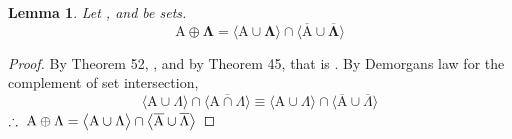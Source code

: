 \documentclass[preview]{standalone}
\newtheorem{lemma}{Lemma}
\begin{document}
\begin{lemma}%
    Let , and \bm{$\Lambda$} be sets.
    \begin{equation*}
        \bm{
            \mathrm{A} \oplus \Lambda
                =
            \Big \langle \mathrm{A} \cup \Lambda \Big \rangle
                \cap
            \Big \langle 
                \overline{\mathrm{A}} 
                    \cup 
                \overline{\Lambda} 
            \Big \rangle
        }
    \end{equation*}
\end{lemma}
\begin{proof}
    By Theorem 52,
    , 
    and by Theorem 45, that is
    .
    By Demorgans law for the complement of set intersection,
    \begin{equation*}
        \Big \langle \mathrm{A} \cup \Lambda \Big \rangle
            \cap
        \Big \langle \overline{\mathrm{A} \cap \Lambda} \Big \rangle
            \equiv
        \Big \langle \mathrm{A} \cup \Lambda \Big \rangle
            \cap
        \Big \langle \overline{\mathrm{A}} \cup \overline{\Lambda} \Big \rangle
    \end{equation*}
    $\therefore \text{\space} \relax{
    \mathrm{A} \oplus \Lambda
        =
    \big \langle \mathrm{A} \cup \Lambda \big \rangle
        \cap
    \big \langle 
        \overline{\mathrm{A}} 
            \cup 
        \overline{\Lambda} 
    \big \rangle}$
\end{proof}
\end{document}
